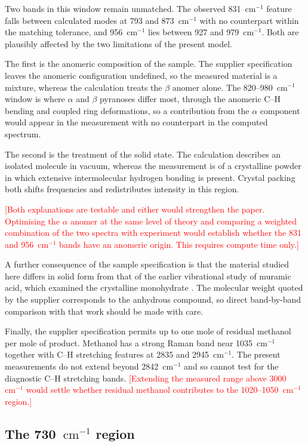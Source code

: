 \documentclass[11pt,a4paper]{article}
\newcommand{\wn}{\ensuremath{\mathrm{cm}^{-1}}}
\newcommand{\authorcheck}[1]{\textcolor{red}{[#1]}}
\begin{document}
Two bands in this window remain unmatched. The observed 831~\wn{} feature falls
between calculated modes at 793 and 873~\wn{} with no counterpart within the
matching tolerance, and 956~\wn{} lies between 927 and 979~\wn{}. Both are
plausibly affected by the two limitations of the present model.

The first is the anomeric composition of the sample. The supplier specification
leaves the anomeric configuration undefined, so the measured material is a
mixture, whereas the calculation treats the $\beta$ anomer alone. The
820--980~\wn{} window is where $\alpha$ and $\beta$ pyranoses differ most,
through the anomeric C--H bending and coupled ring deformations, so a
contribution from the $\alpha$ component would appear in the measurement with
no counterpart in the computed spectrum.

The second is the treatment of the solid state. The calculation describes an
isolated molecule in vacuum, whereas the measurement is of a crystalline powder
in which extensive intermolecular hydrogen bonding is present. Crystal packing
both shifts frequencies and redistributes intensity in this region.

\authorcheck{Both explanations are testable and either would strengthen the
paper. Optimising the $\alpha$ anomer at the same level of theory and comparing
a weighted combination of the two spectra with experiment would establish
whether the 831 and 956~\wn{} bands have an anomeric origin. This requires
compute time only.}

A further consequence of the sample specification is that the material studied
here differs in solid form from that of the earlier vibrational study of muramic
acid, which examined the crystalline monohydrate \cite{kouach1994}. The
molecular weight quoted by the supplier corresponds to the anhydrous compound,
so direct band-by-band comparison with that work should be made with care.

Finally, the supplier specification permits up to one mole of residual methanol
per mole of product. Methanol has a strong Raman band near 1035~\wn{} together
with C--H stretching features at 2835 and 2945~\wn{}. The present measurements
do not extend beyond 2842~\wn{} and so cannot test for the diagnostic C--H
stretching bands.
\authorcheck{Extending the measured range above 3000~\wn{} would settle whether
residual methanol contributes to the 1020--1050~\wn{} region.}

\subsection{The 730~\wn{} region}
\end{document}
